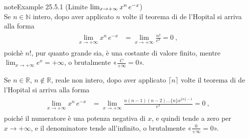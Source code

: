 \documentclass[letterpaper,10pt,italian]{jupyterBook}
\begin{document}
\begin{sphinxadmonition}{note}{Example 25.5.1 (Limite \protect\(\lim_{x \rightarrow +\infty} x^n \, e^{-x}\protect\))}
\begin{equation*}
\end{equation*}
\sphinxAtStartPar
Se \(n \in \mathbb{N}\) intero, dopo aver applicato \(n\) volte il teorema di de l’Hopital si arriva alla forma
\begin{equation*}
\begin{split}\begin{aligned}
  \lim_{x \rightarrow +\infty} x^n \, e^{-x}
  & = \lim_{x \rightarrow +\infty} \frac{n!}{e^x} = 0 \ ,
\end{aligned}\end{split}
\end{equation*}
\sphinxAtStartPar
poichè \(n!\), pur quanto grande sia, è una costante di valore finito, mentre \(\lim_{x \rightarrow +\infty} e^{x} = +\infty\), o brutalmente «\(\frac{C}{+\infty} = 0\)».

\sphinxAtStartPar
Se \(n \in \mathbb{R}\), \(n \notin \mathbb{R}\), reale non intero, dopo aver applicato \(\lceil n \rceil\) volte il teorema di de l’Hopital si arriva alla forma
\begin{equation*}
\begin{split}\begin{aligned}
  \lim_{x \rightarrow +\infty} x^n \, e^{-x}
  & = \lim_{x \rightarrow +\infty} \frac{n(n-1)(n-2)\dots\{ n \} x^{\{ n \}-1}}{e^x} = 0 \ ,
\end{aligned}\end{split}
\end{equation*}
\sphinxAtStartPar
poiché il numeratore è una potenza negativa di \(x\), e quindi tende a zero per \(x \rightarrow +\infty\), e il denominatore tende all’infinito, o brutalmente «\(\frac{0}{+\infty} = 0\)».
\end{sphinxadmonition}
\end{document}
